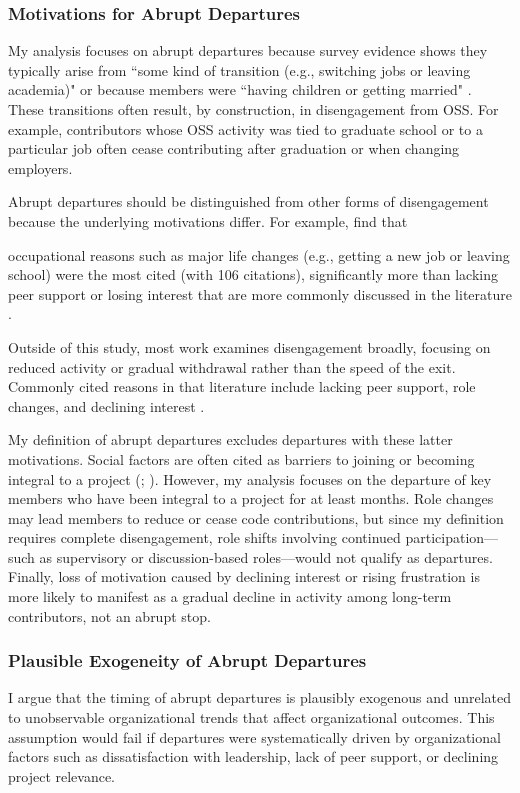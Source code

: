 \documentclass[12pt,notitlepage]{article}
\begin{document}
\subsubsection{Motivations for Abrupt Departures}\label{sec:abrupt_departure_motivation}
My analysis focuses on abrupt departures because survey evidence shows they typically arise from ``some kind of transition (e.g., switching jobs or leaving academia)" or because members were ``having children or getting married" \citep{miller_why_2019}. 
These transitions often result, by construction, in disengagement from OSS.
For example, contributors whose OSS activity was tied to graduate school or to a particular job often cease contributing after graduation or when changing employers.

Abrupt departures should be distinguished from other forms of disengagement because the underlying motivations differ. 
For example, \cite{miller_why_2019} find that
\begin{displayquote}
occupational reasons such as major life changes (e.g., getting a new job or leaving school) were the most cited (with 106 citations), significantly more than lacking peer support or losing interest that are more commonly discussed in the literature \citep{miller_why_2019}.
\end{displayquote}
Outside of this study, most work examines disengagement broadly, focusing on reduced activity or gradual withdrawal rather than the speed of the exit. 
Commonly cited reasons in that literature include lacking peer support, role changes, and declining interest \citep{iaffaldano_preliminary_2019}.

My definition of abrupt departures excludes departures with these latter motivations. 
Social factors are often cited as barriers to joining or becoming integral to a project (\citealt{bosu_impact_2014}; \citealt{steinmacher_let_2019}). 
However, my analysis focuses on the departure of key members who have been integral to a project for at least \MinConsecutiveMonths{} months.
Role changes may lead members to reduce or cease code contributions, but since my definition requires complete disengagement, role shifts involving continued participation—such as supervisory or discussion-based roles—would not qualify as departures. 
Finally, loss of motivation caused by declining interest or rising frustration is more likely to manifest as a gradual decline in activity among long-term contributors, not an abrupt stop.
\subsubsection{Plausible Exogeneity of Abrupt Departures}
I argue that the timing of abrupt departures is plausibly exogenous and unrelated to unobservable organizational trends that affect organizational outcomes.
This assumption would fail if departures were systematically driven by organizational factors such as dissatisfaction with leadership, lack of peer support, or declining project relevance.
\end{document}
